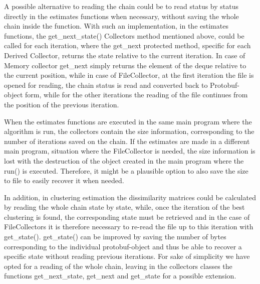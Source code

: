 A possible alternative to reading the chain could be to read status by status directly in the estimates functions when necessary, without saving the whole chain inside the function. 
With such an implementation, in the estimates functions, the get\_next\_state() Collectors method mentioned above, could be called for each iteration, where the get\_next protected method, specific for each Derived Collector, returns the state relative to the current iteration. 
In case of Memory collector get\_next simply returns the element of the deque relative to the current position, while in case of FileCollector, at the first iteration the file is opened for reading, the chain status is read and converted back to Protobuf-object form, while for the other iterations the reading of the file continues from the position of the previous iteration.

When the estimates functions are executed in the same main program where the algorithm is run, the collectors contain the size information, corresponding to the number of iterations saved on the chain. 
If the estimates are made in a different main program, situation where the FileCollector is needed, the size information is lost with the destruction of the object created in the main program where the run() is executed. Therefore, it might be a plausible option to also save the size to file to easily recover it when needed. 

In addition, in clustering estimation the dissimilarity matrices could be calculated by reading the whole chain state by state, while, once the iteration of the best clustering is found, the corresponding state must be retrieved and in the case of FileCollectors it is therefore necessary to re-read the file up to this iteration with get\_state(). get\_state() can be improved by saving the number of bytes corresponding to the individual protobuf-object and thus be able to recover a specific state without reading previous iterations. For sake of simplicity we have opted for a reading of the whole chain, leaving in the collectors classes the functions get\_next\_state, get\_next and get\_state for a possible extension.